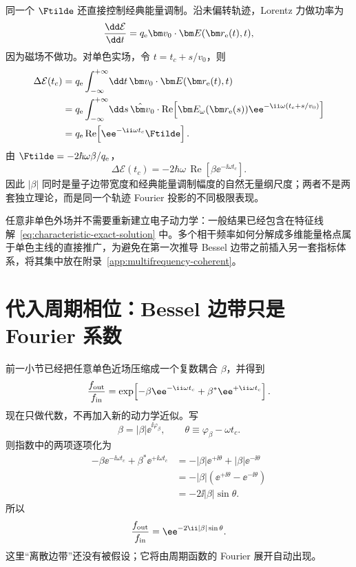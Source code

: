同一个 $\Ftilde$ 还直接控制经典能量调制。沿未偏转轨迹，Lorentz 力做功率为
\begin{equation}
 \frac{\dd\mathcal E}{\dd t}=q_{\rm e}\bm v_0\cdot\bm E(\bm r_{\rm e}(t),t),
\end{equation}
因为磁场不做功。对单色实场，令 $t=t_c+s/v_0$，则
\begin{align}
\Delta\mathcal E(t_c)
&=q_{\rm e}\int_{-\infty}^{+\infty}\!\dd t\,
\bm v_0\cdot\bm E(\bm r_{\rm e}(t),t)\\
&=q_{\rm e}\int_{-\infty}^{+\infty}\!\dd s\,
\hat{\bm v}_0\cdot
\operatorname{Re}\!\left[
\bm E_\omega(\bm r_{\rm e}(s))
\ee^{-\ii\omega(t_c+s/v_0)}
\right]\\
&=q_{\rm e}\operatorname{Re}\!\left[
\ee^{-\ii\omega t_c}\Ftilde
\right].
\label{eq:classical-energy-modulation}
\end{align}
由 $\Ftilde=-2\hbar\omega\beta/q_{\rm e}$，
\begin{equation}
 \boxed{
 \Delta\mathcal E(t_c)
 =-2\hbar\omega\,
 \operatorname{Re}\!\left[
 \beta\ee^{-\ii\omega t_c}
 \right].}
 \label{eq:classical-energy-beta}
\end{equation}
因此 $|\beta|$ 同时是量子边带宽度和经典能量调制幅度的自然无量纲尺度；两者不是两套独立理论，而是同一个轨迹 Fourier 投影的不同极限表现。

任意非单色外场并不需要重新建立电子动力学：一般结果已经包含在特征线解~\eqref{eq:characteristic-exact-solution} 中。多个相干频率如何分解成多维能量格点属于单色主线的直接推广，为避免在第一次推导 Bessel 边带之前插入另一套指标体系，将其集中放在附录~\ref{app:multifrequency-coherent}。



\section{代入周期相位：Bessel 边带只是 Fourier 系数}

前一小节已经把任意单色近场压缩成一个复数耦合 $\beta$，并得到
\begin{equation}
\frac{f_{\rm out}}{f_{\rm in}}
=\exp\!\left[-\beta\ee^{-\ii\omega t_c}
+\beta^*\ee^{+\ii\omega t_c}\right].
\label{eq:phase-beta-start-sideband}
\end{equation}
现在只做代数，不再加入新的动力学近似。写
\begin{equation}
\beta=|\beta|\ee^{\ii\varphi_\beta},
\qquad
\theta\equiv\varphi_\beta-\omega t_c .
\end{equation}
则指数中的两项逐项化为
\begin{align}
-\beta\ee^{-\ii\omega t_c}
+\beta^*\ee^{+\ii\omega t_c}
&=-|\beta|\ee^{+\ii\theta}
+|\beta|\ee^{-\ii\theta}\\
&=-|\beta|\left(\ee^{+\ii\theta}-\ee^{-\ii\theta}\right)\\
&=-2\ii|\beta|\sin\theta .
\end{align}
所以
\begin{equation}
\frac{f_{\rm out}}{f_{\rm in}}
=\ee^{-2\ii|\beta|\sin\theta}.
\label{eq:phase-sine-sideband}
\end{equation}
这里“离散边带”还没有被假设；它将由周期函数的 Fourier 展开自动出现。

